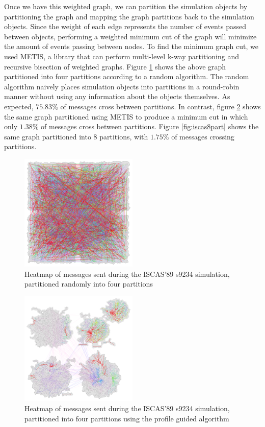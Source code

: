 \documentclass{wscpaperproc}
\begin{document}
Once we have this weighted graph, we can partition the simulation objects by partitioning the graph and mapping the graph partitions back to the simulation objects. Since the weight of each edge represents the number of events passed between objects, performing a weighted minimum cut of the graph will minimize the amount of events passing between nodes. To find the minimum graph cut, we used METIS, a library that can perform multi-level k-way partitioning and recursive bisection of weighted graphs. Figure \ref{fig:iscas4rr} shows the above graph partitioned into four partitions according to a random algorithm. The random algorithm naively places simulation objects into partitions in a round-robin manner without using any information about the objects themselves. As expected, \(75.83\%\) of messages cross between partitions. In contrast, figure \ref{fig:iscas4part} shows the same graph partitioned using METIS to produce a minimum cut in which only \(1.38\%\) of messages cross between partitions. Figure \ref{fig:iscas8part} shows the same graph partitioned into 8 partitions, with \(1.75\%\) of messages crossing partitions.

\begin{figure}[h]
\centering
\includegraphics[clip=true,width=0.5\textwidth]{s9234_4rr}
\caption{Heatmap of messages sent during the ISCAS'89 s9234 simulation, partitioned randomly into four partitions}
\label{fig:iscas4rr}
\end{figure}

\begin{figure}[h]
\centering
\includegraphics[clip=true,width=0.5\textwidth]{s9234_4part}
\caption{Heatmap of messages sent during the ISCAS'89 s9234 simulation, partitioned into four partitions using the profile guided algorithm}
\label{fig:iscas4part}
\end{figure}
\end{document}
